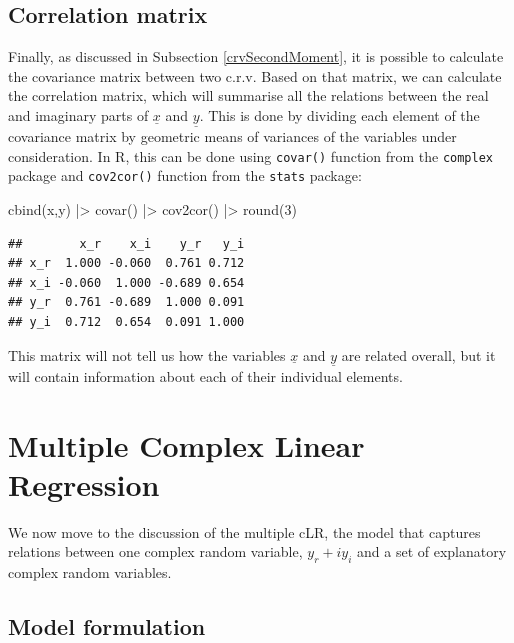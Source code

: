 \documentclass[
]{book}
\newenvironment{Shaded}{\begin{snugshade}}{\end{snugshade}}
\newcommand{\DecValTok}[1]{\textcolor[rgb]{0.00,0.00,0.81}{#1}}
\newcommand{\FunctionTok}[1]{\textcolor[rgb]{0.00,0.00,0.00}{#1}}
\newcommand{\NormalTok}[1]{#1}
\newcommand{\SpecialCharTok}[1]{\textcolor[rgb]{0.00,0.00,0.00}{#1}}
\begin{document}
\hypertarget{correlation-matrix}{%
\section{Correlation matrix}\label{correlation-matrix}}

Finally, as discussed in Subsection \ref{crvSecondMoment}, it is possible to calculate the covariance matrix between two c.r.v. Based on that matrix, we can calculate the correlation matrix, which will summarise all the relations between the real and imaginary parts of \(\underline{x}\) and \(\underline{y}\). This is done by dividing each element of the covariance matrix by geometric means of variances of the variables under consideration. In R, this can be done using \texttt{covar()} function from the \texttt{complex} package and \texttt{cov2cor()} function from the \texttt{stats} package:

\begin{Shaded}
\begin{Highlighting}[]
\FunctionTok{cbind}\NormalTok{(x,y) }\SpecialCharTok{|\textgreater{}} \FunctionTok{covar}\NormalTok{() }\SpecialCharTok{|\textgreater{}} \FunctionTok{cov2cor}\NormalTok{() }\SpecialCharTok{|\textgreater{}} \FunctionTok{round}\NormalTok{(}\DecValTok{3}\NormalTok{)}
\end{Highlighting}
\end{Shaded}

\begin{verbatim}
##        x_r    x_i    y_r   y_i
## x_r  1.000 -0.060  0.761 0.712
## x_i -0.060  1.000 -0.689 0.654
## y_r  0.761 -0.689  1.000 0.091
## y_i  0.712  0.654  0.091 1.000
\end{verbatim}

This matrix will not tell us how the variables \(\underline{x}\) and \(\underline{y}\) are related overall, but it will contain information about each of their individual elements.

\hypertarget{multipleCLR}{%
\chapter{Multiple Complex Linear Regression}\label{multipleCLR}}

We now move to the discussion of the multiple cLR, the model that captures relations between one complex random variable, \(y_r + i y_i\) and a set of explanatory complex random variables.

\hypertarget{model-formulation}{%
\section{Model formulation}\label{model-formulation}}
\end{document}
